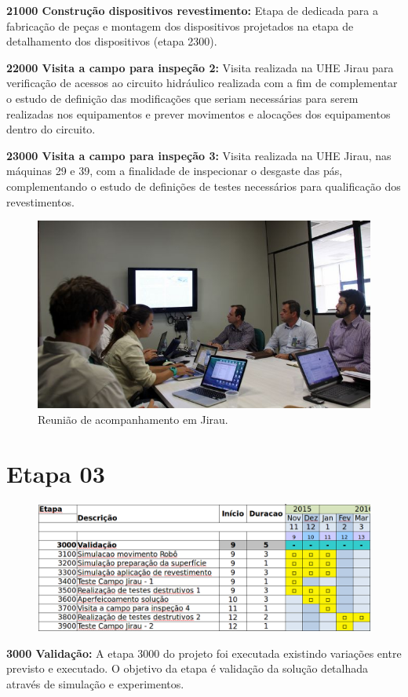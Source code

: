 \noindent
\textbf{21000 Construção dispositivos revestimento:} Etapa de dedicada para a
fabricação de peças e montagem dos dispositivos projetados na etapa de
detalhamento dos dispositivos (etapa 2300).


\noindent
\textbf{22000 Visita a campo para inspeção 2:} Visita realizada na UHE Jirau
para verificação de acessos ao circuito hidráulico realizada com a fim de
complementar o estudo de definição das modificações que seriam necessárias para
serem realizadas nos equipamentos e prever movimentos e alocações dos
equipamentos dentro do circuito.


\noindent
\textbf{23000 Visita a campo para inspeção 3:} Visita realizada na UHE Jirau,
nas máquinas 29 e 39, com a finalidade de inspecionar o desgaste das pás,
complementando o estudo de definições de testes necessários para qualificação
dos revestimentos.

\begin{figure}\centering
\includegraphics[width=0.6\columnwidth]{figs/img_4836}
\caption{Reunião de acompanhamento em Jirau.}
\end{figure} 

\section{Etapa 03} 

\begin{figure}[H]
\centering
\includegraphics[width=0.9\columnwidth]{figs/etapa3}
\end{figure} 

\noindent
\textbf{3000 Validação:} A etapa 3000 do projeto foi executada existindo
variações entre previsto e executado. O objetivo da etapa é validação da solução
detalhada através de simulação e experimentos.

